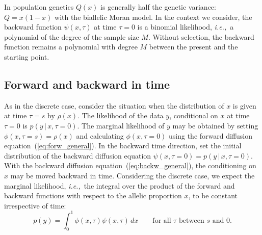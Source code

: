 \documentclass[preprint]{elsarticle}
\newcommand\given{{\,|\,}}
\newcommand\ie{{\it i.e.,}}
\newcommand\s{\ensuremath{s}}
\begin{document}
In population genetics $Q(x)$ is generally half the genetic variance: $Q=x(1-x)$ with the biallelic Moran model. In the context we consider, the backward function $\psi(x,\tau)$ at time $\tau=0$ is a binomial likelihood, \ie\ a polynomial of the degree of the sample size $M$. Without selection, the backward function remains a polynomial with degree $M$ between the present and the starting point. 

\subsection{Forward and backward in time}

As in the discrete case, consider the situation when the distribution of $x$ is given at time $\tau=\s$ by $\rho(x)$. The likelihood of the data $y$, conditional on $x$ at time $\tau=0$ is $p(y\given x,\tau=0)$. The marginal likelihood of $y$ may be obtained by setting $\phi(x,\tau=\s)=\rho(x)$ and calculating $\phi(x,\tau=0)$ using the forward diffusion equation~(\ref{eq:forw_general}). In the backward time direction, set the initial distribution of the backward diffusion equation  $\psi(x,\tau=0)=p(y\given x,\tau=0)$. With the backward diffusion equation~(\ref{eq:backw_general}), the conditioning on $x$ may be moved backward in time. Considering the discrete case, we expect the marginal likelihood, \ie\ the integral over the product of the forward and backward functions with respect to the allelic proportion $x$, to be constant irrespective of time:
\begin{equation}\label{eq:marg_like}
p(y) = \int_{0}^{1} \phi(x,\tau)\psi(x,\tau)  \,dx \qquad\text{for all $\tau$ between $s$ and $0$.}
\end{equation}
\end{document}
